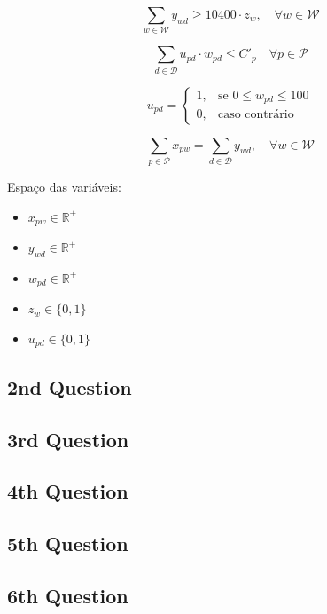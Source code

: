 \documentclass[12pt,a4paper]{article}
\begin{document}
\begin{equation} %
    \sum_{w \in \mathcal{W}} y_{wd}
    \geq 10400 \cdot z_{w}, \quad
    \forall w \in \mathcal{W}
\end{equation}


\begin{equation} %
    \sum_{d \in \mathcal{D}} u_{pd} \cdot w_{pd} \leq C'_p \quad \forall p \in \mathcal{P}
\end{equation}

\begin{equation}%
    u_{pd} =
    \begin{cases}
        1, & \text{se } 0 \leq w_{pd} \leq 100 \\
        0, & \text{caso contrário}
    \end{cases}
\end{equation}


\begin{equation} %
    \sum_{p \in \mathcal{P}} x_{pw} =
    \sum_{d \in \mathcal{D}} y_{wd}, \quad
    \forall w \in \mathcal{W}
\end{equation}

Espaço das variáveis:

\begin{itemize}
    \item $x_{pw} \in \mathbb{R}^+$
    \item $y_{wd} \in \mathbb{R}^+$
    \item $w_{pd} \in \mathbb{R}^+$
    \item $z_{w} \in \{0, 1\}$
    \item $u_{pd} \in \{0, 1\}$
\end{itemize}




\subsection{2nd Question}
\cite{states_centers}
\cite{ballou}

\subsection{3rd Question}


\subsection{4th Question}


\subsection{5th Question}


\subsection{6th Question}



\end{document}
